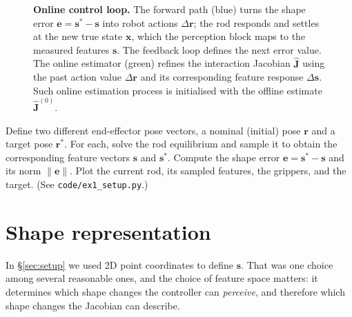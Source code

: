\documentclass[11pt,a4paper]{article}
\begin{document}
\begin{figure}[h!]
{}
\caption{\textbf{Online control loop.} The forward path (blue) turns the shape error
$\mathbf{e}=\mathbf{s}^{*}-\mathbf{s}$ into robot actions $\Delta\mathbf{r}$; the rod responds and settles at the new true state $\mathbf{x}$, which the perception block maps
to the measured features $\mathbf{s}$. The feedback loop defines the next error value. The online
estimator (green) refines the interaction Jacobian $\hat{\mathbf{J}}$ using the past action value  $\Delta\mathbf{r}$ and
its corresponding feature response $\Delta\mathbf{s}$. Such online estimation process is initialised with the offline estimate $\hat{\mathbf{J}}^{(0)}$.}
\label{fig:online}
\end{figure}

\begin{labexercise}[Exercise~1]
Define two different end-effector pose vectors, a nominal (initial) pose $\mathbf{r}$ and a target pose $\mathbf{r}^{*}$.
For each, solve the rod equilibrium and sample it to obtain the corresponding feature
vectors $\mathbf{s}$ and $\mathbf{s}^{*}$. Compute the shape error $\mathbf{e}=\mathbf{s}^{*}-\mathbf{s}$ and its norm $\lVert\mathbf{e}\rVert$.
Plot the current rod, its sampled features, the grippers, and the target.
(See \texttt{code/ex1\_setup.py}.)
\end{labexercise}

\section{Shape representation}
\label{sec:representation}

In \S\ref{sec:setup} we used 2D point coordinates to define $\mathbf{s}$. That was one choice among
several reasonable ones, and the choice of feature space matters: it determines which shape
changes the controller can \emph{perceive}, and therefore which shape changes the Jacobian can
describe.
\end{document}
